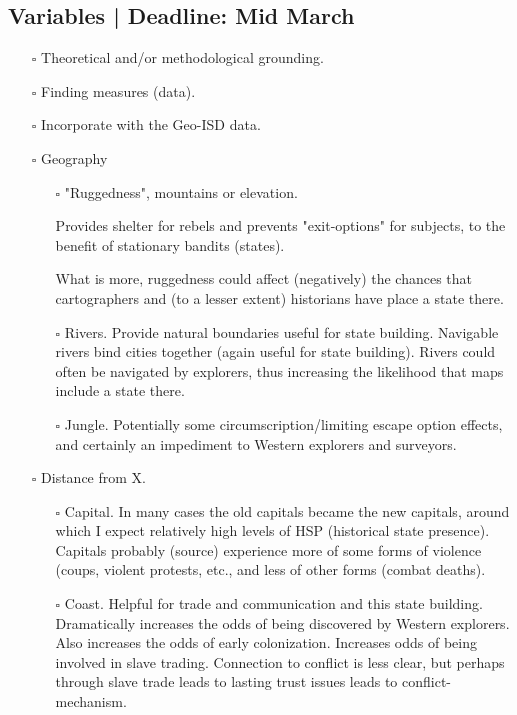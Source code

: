 \documentclass[12pt]{article}
\begin{document}
\subsection{Variables | Deadline: Mid March}
\begin{itemize}
	\item[$\square$] Theoretical and/or methodological grounding.

	\item[$\square$] Finding measures (data).

	\item[$\square$] Incorporate with the Geo-ISD data.

	\item[$\square$] Geography
	\begin{itemize}
		\item[$\square$] "Ruggedness", mountains or elevation.

			Provides shelter for rebels and prevents "exit-options"
			for subjects, to the benefit of stationary bandits
			(states).

			What is more, ruggedness could affect (negatively) the
			chances that cartographers and (to a lesser extent)
			historians have place a state there.


		\item[$\square$] Rivers.
			Provide natural boundaries useful for state building.
			Navigable rivers bind cities together (again useful for
			state building). Rivers could often be navigated by
			explorers, thus increasing the likelihood that maps
			include a state there.

		\item[$\square$] Jungle. Potentially some
			circumscription/limiting escape option effects, and
			certainly an impediment to Western explorers and
			surveyors.
	\end{itemize}

	\item[$\square$] Distance from X.
	\begin{itemize}
		\item[$\square$] Capital. In many cases the old capitals became
			the new capitals, around which I expect relatively high
			levels of HSP (historical state presence). Capitals
			probably (source) experience more of some forms of
			violence (coups, violent protests, etc., and less of
			other forms (combat deaths).

		\item[$\square$] Coast. Helpful for trade and communication and
			this state building. Dramatically increases the odds of
			being discovered by Western explorers. Also increases
			the odds of early colonization. Increases odds of being
			involved in slave trading. Connection to conflict is
			less clear, but perhaps through \citet{Nunn2008} slave
			trade leads to lasting trust issues leads to
			conflict-mechanism.


\end{itemize}
\end{itemize}
\end{document}
